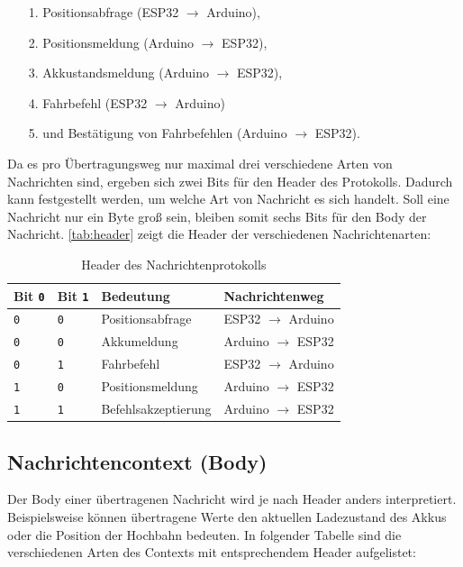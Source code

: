\begin{itemize}
	\item [1.] Positionsabfrage (ESP32 $\rightarrow$ Arduino),
	\item [2.] Positionsmeldung (Arduino $\rightarrow$ ESP32),
	\item [3.] Akkustandsmeldung (Arduino $\rightarrow$ ESP32),
	\item [4.] Fahrbefehl (ESP32 $\rightarrow$ Arduino)
	\item [5.] und Bestätigung von Fahrbefehlen (Arduino $\rightarrow$ ESP32).
\end{itemize}

Da es pro Übertragungsweg nur maximal drei verschiedene Arten von Nachrichten sind, ergeben sich zwei Bits für den Header des Protokolls. Dadurch kann festgestellt werden, um welche Art von Nachricht es sich handelt.
Soll eine Nachricht nur ein Byte groß sein, bleiben somit sechs Bits für den Body der Nachricht. 
\autoref{tab:header} zeigt die Header der verschiedenen Nachrichtenarten:
\begin{table}[h]
	\begin{center}
		\begin{tabular}{m{2cm} | m{2cm} | m{5cm} | m{5cm}}
			Bit \texttt{0} & Bit \texttt{1} & Bedeutung & Nachrichtenweg\\
			\hline 
			\texttt{0} & \texttt{0} & Positionsabfrage  & ESP32 $\rightarrow$ Arduino\\
			\hline 
			\texttt{0} & \texttt{0} & Akkumeldung & Arduino $\rightarrow$ ESP32\\
			\hline 
			\texttt{0} & \texttt{1} & Fahrbefehl & ESP32 $\rightarrow$ Arduino\\
			\hline 
			\texttt{1} & \texttt{0} & Positionsmeldung & Arduino $\rightarrow$ ESP32\\
			\hline 
			\texttt{1} & \texttt{1} & Befehlsakzeptierung & Arduino $\rightarrow$ ESP32\\
		\end{tabular}
	\end{center}
	\caption{\label{tab:header}Header des Nachrichtenprotokolls}
\end{table}

\subsection{Nachrichtencontext (Body)}
Der Body einer übertragenen Nachricht wird je nach Header anders interpretiert. Beispielsweise können übertragene Werte den aktuellen Ladezustand des Akkus oder die Position der Hochbahn bedeuten. 
In folgender Tabelle sind die verschiedenen Arten des Contexts mit entsprechendem Header aufgelistet:

